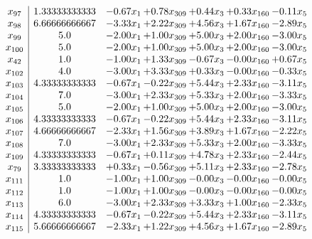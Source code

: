 \documentclass[8pt]{article}
\begin{document}
\[\begin{array}{c| c c@{\hskip 2pt} c@{\hskip 2pt} c@{\hskip 2pt} c@{\hskip 2pt} c@{\hskip 2pt} }
 x_{97}   &  1.33333333333 & -0.67 x_{1} & +  0.78 x_{309} & +  0.44 x_{3} & +  0.33 x_{160} & -0.11 x_{5}\\
 x_{98}   &  6.66666666667 & -3.33 x_{1} & +  2.22 x_{309} & +  4.56 x_{3} & +  1.67 x_{160} & -2.89 x_{5}\\
 x_{99}   &  5.0 & -2.00 x_{1} & +  1.00 x_{309} & +  5.00 x_{3} & +  2.00 x_{160} & -3.00 x_{5}\\
 x_{100}   &  5.0 & -2.00 x_{1} & +  1.00 x_{309} & +  5.00 x_{3} & +  2.00 x_{160} & -3.00 x_{5}\\
 x_{42}   &  1.0 & -1.00 x_{1} & +  1.33 x_{309} & -0.67 x_{3} & -0.00 x_{160} & +  0.67 x_{5}\\
 x_{102}   &  4.0 & -3.00 x_{1} & +  3.33 x_{309} & +  0.33 x_{3} & -0.00 x_{160} & -0.33 x_{5}\\
 x_{103}   &  4.33333333333 & -0.67 x_{1} & -0.22 x_{309} & +  5.44 x_{3} & +  2.33 x_{160} & -3.11 x_{5}\\
 x_{104}   &  7.0 & -3.00 x_{1} & +  2.33 x_{309} & +  5.33 x_{3} & +  2.00 x_{160} & -3.33 x_{5}\\
 x_{105}   &  5.0 & -2.00 x_{1} & +  1.00 x_{309} & +  5.00 x_{3} & +  2.00 x_{160} & -3.00 x_{5}\\
 x_{106}   &  4.33333333333 & -0.67 x_{1} & -0.22 x_{309} & +  5.44 x_{3} & +  2.33 x_{160} & -3.11 x_{5}\\
 x_{107}   &  4.66666666667 & -2.33 x_{1} & +  1.56 x_{309} & +  3.89 x_{3} & +  1.67 x_{160} & -2.22 x_{5}\\
 x_{108}   &  7.0 & -3.00 x_{1} & +  2.33 x_{309} & +  5.33 x_{3} & +  2.00 x_{160} & -3.33 x_{5}\\
 x_{109}   &  4.33333333333 & -0.67 x_{1} & +  0.11 x_{309} & +  4.78 x_{3} & +  2.33 x_{160} & -2.44 x_{5}\\
 x_{79}   &  3.33333333333 & +  0.33 x_{1} & -0.56 x_{309} & +  5.11 x_{3} & +  2.33 x_{160} & -2.78 x_{5}\\
 x_{111}   &  1.0 & -1.00 x_{1} & +  1.00 x_{309} & -0.00 x_{3} & -0.00 x_{160} & -0.00 x_{5}\\
 x_{112}   &  1.0 & -1.00 x_{1} & +  1.00 x_{309} & -0.00 x_{3} & -0.00 x_{160} & -0.00 x_{5}\\
 x_{113}   &  6.0 & -3.00 x_{1} & +  2.33 x_{309} & +  3.33 x_{3} & +  1.00 x_{160} & -2.33 x_{5}\\
 x_{114}   &  4.33333333333 & -0.67 x_{1} & -0.22 x_{309} & +  5.44 x_{3} & +  2.33 x_{160} & -3.11 x_{5}\\
 x_{115}   &  5.66666666667 & -2.33 x_{1} & +  1.22 x_{309} & +  4.56 x_{3} & +  1.67 x_{160} & -2.89 x_{5}\\

\end{array}\]
\end{document}
